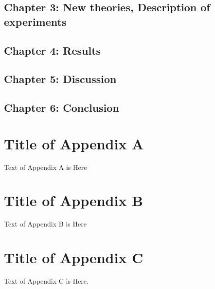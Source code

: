 \documentclass{article}
\begin{document}
	\subsection{Chapter 3: New theories, Description of experiments}
	\subsection{Chapter 4: Results}
	\subsection{Chapter 5: Discussion}
	\subsection{Chapter 6: Conclusion}
	
	
	
	

	\appendix
	\section{Title of Appendix A}

	Text of Appendix A is Here

	\section{Title of Appendix B}

	Text of Appendix B is Here
	
	\section{Title of Appendix C}
	
	Text of Appendix C is Here.
\end{document}
